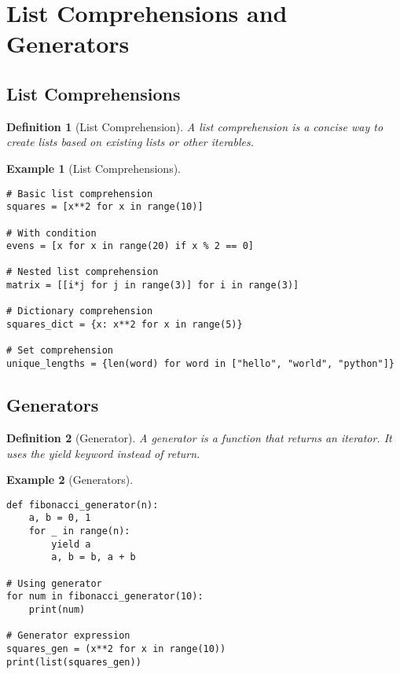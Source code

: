 \documentclass[11pt]{article}
\newtheorem{definition}{Definition}[section]
\newtheorem{example}{Example}[section]
\begin{document}
\section{List Comprehensions and Generators}

\subsection{List Comprehensions}

\begin{definition}[List Comprehension]
A list comprehension is a concise way to create lists based on existing lists or other iterables.
\end{definition}

\begin{example}[List Comprehensions]
\begin{lstlisting}
# Basic list comprehension
squares = [x**2 for x in range(10)]

# With condition
evens = [x for x in range(20) if x % 2 == 0]

# Nested list comprehension
matrix = [[i*j for j in range(3)] for i in range(3)]

# Dictionary comprehension
squares_dict = {x: x**2 for x in range(5)}

# Set comprehension
unique_lengths = {len(word) for word in ["hello", "world", "python"]}
\end{lstlisting}
\end{example}

\subsection{Generators}

\begin{definition}[Generator]
A generator is a function that returns an iterator. It uses the yield keyword instead of return.
\end{definition}

\begin{example}[Generators]
\begin{lstlisting}
def fibonacci_generator(n):
    a, b = 0, 1
    for _ in range(n):
        yield a
        a, b = b, a + b

# Using generator
for num in fibonacci_generator(10):
    print(num)

# Generator expression
squares_gen = (x**2 for x in range(10))
print(list(squares_gen))
\end{lstlisting}
\end{example}
\end{document}
